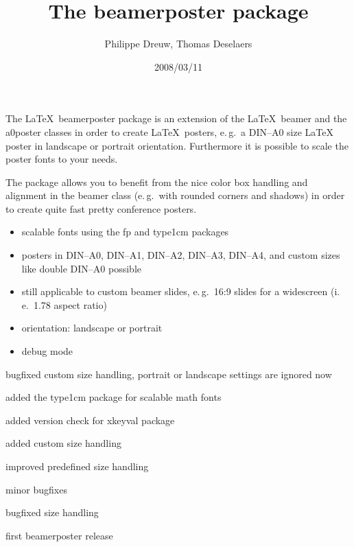 \documentclass[pagesize=auto]{scrartcl}
\title{The \textsf{beamerposter} package}
\author{Philippe Dreuw, Thomas Deselaers}
\date{2008/03/11}
\begin{document}
\maketitle

\noindent
The \LaTeX\ \textsf{beamerposter} package is an extension of the \LaTeX\ \textsf{beamer} and the  
\textsf{a0poster} classes in order to create \LaTeX\ posters, e.\,g.\ a DIN--A0 size \LaTeX\ %
poster in landscape or portrait orientation. Furthermore it is possible 
to scale the poster fonts to your needs. 

The package allows you to benefit from the nice color box handling and 
alignment in the \textsf{beamer} class (e.\,g.\ with rounded corners and shadows) 
in order to create quite fast pretty conference posters.


%
\begin{itemize}
\item scalable fonts using the \textsf{fp} and \textsf{type1cm} packages
\item posters in DIN--A0, DIN--A1, DIN--A2, DIN--A3, DIN--A4, and custom sizes 
  like double DIN--A0 possible
\item still applicable to custom beamer slides, e.\,g.\ 16:9 slides for a 
  widescreen (i.\,e.\ 1.78 aspect ratio)
\item orientation: landscape or portrait
\item debug mode
\end{itemize}


%
\begin{labeling}[\hspace{\labelsep}--]{1.07}
\item[1.07] bugfixed custom size handling, portrait or landscape settings are ignored now
\item[1.06] added the \textsf{type1cm} package for scalable math fonts
\item[1.05] added version check for \textsf{xkeyval} package
\item[1.04] added custom size handling
\item[1.03] improved predefined size handling
\item[1.02] minor bugfixes
\item[1.01] bugfixed size handling
\item[1.00] first \textsf{beamerposter} release
\end{labeling}
\end{document}
